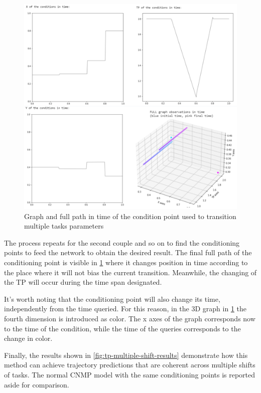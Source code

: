 \begin{figure}
    \centering
    \includegraphics[width=0.7\linewidth]{figures/tp-multiple-shift-condition.png}
    \caption{ Graph and full path in time of the condition point used to transition multiple tasks parameters }
    \label{fig:tp-multiple-shift-condition}
\end{figure}


The process repeats for the second couple and so on to find the conditioning points to feed the network to obtain the desired result. 
The final full path of the conditioning point is visible in \cref{fig:tp-multiple-shift-condition} where it changes position in time according to the place where it will not bias the current transition. Meanwhile, the changing of the TP will occur during the time span designated.

It's worth noting that the conditioning point will also change its time, independently from the time queried. For this reason, in the 3D graph in \cref{fig:tp-multiple-shift-condition} the fourth dimension is introduced as color. The x axes of the graph corresponds now to the time of the condition, while the time of the queries corresponds to the change in color. 

Finally, the results shown in \cref{fig:tp-multiple-shift-results} demonstrate how this method can achieve trajectory predictions that are coherent across multiple shifts of tasks. The normal CNMP model with the same conditioning points is reported aside for comparison. 

